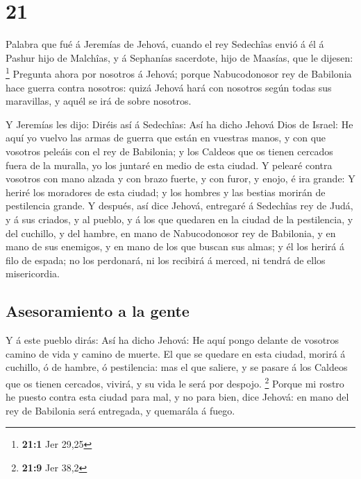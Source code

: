 \hypertarget{section-20}{%
\section{21}\label{section-20}}

 Palabra que fué á Jeremías de Jehová, cuando el rey
Sedechîas envió á él á Pashur hijo de Malchîas, y á Sephanías sacerdote,
hijo de Maasías, que le dijesen: \footnote{\textbf{21:1} Jer 29,25}
 Pregunta ahora por nosotros á Jehová; porque
Nabucodonosor rey de Babilonia hace guerra contra nosotros: quizá Jehová
hará con nosotros según todas sus maravillas, y aquél se irá de sobre
nosotros.

 Y Jeremías les dijo: Diréis así á Sedechîas:
 Así ha dicho Jehová Dios de Israel: He aquí yo vuelvo las
armas de guerra que están en vuestras manos, y con que vosotros peleáis
con el rey de Babilonia; y los Caldeos que os tienen cercados fuera de
la muralla, yo los juntaré en medio de esta ciudad.  Y
pelearé contra vosotros con mano alzada y con brazo fuerte, y con furor,
y enojo, é ira grande:  Y heriré los moradores de esta
ciudad; y los hombres y las bestias morirán de pestilencia grande.
 Y después, así dice Jehová, entregaré á Sedechîas rey de
Judá, y á sus criados, y al pueblo, y á los que quedaren en la ciudad de
la pestilencia, y del cuchillo, y del hambre, en mano de Nabucodonosor
rey de Babilonia, y en mano de sus enemigos, y en mano de los que buscan
sus almas; y él los herirá á filo de espada; no los perdonará, ni los
recibirá á merced, ni tendrá de ellos misericordia.

\hypertarget{asesoramiento-a-la-gente}{%
\subsection{Asesoramiento a la gente}\label{asesoramiento-a-la-gente}}

 Y á este pueblo dirás: Así ha dicho Jehová: He aquí pongo
delante de vosotros camino de vida y camino de muerte.  El
que se quedare en esta ciudad, morirá á cuchillo, ó de hambre, ó
pestilencia: mas el que saliere, y se pasare á los Caldeos que os tienen
cercados, vivirá, y su vida le será por despojo. \footnote{\textbf{21:9}
  Jer 38,2}  Porque mi rostro he puesto contra esta
ciudad para mal, y no para bien, dice Jehová: en mano del rey de
Babilonia será entregada, y quemarála á fuego.

